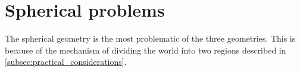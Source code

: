\section{Spherical problems} \label{sec:spherical_problems}
The spherical geometry is the most problematic of the three geometries.
This is because of the mechanism of dividing the world into two regions described in \autoref{subsec:practical_considerations}.
